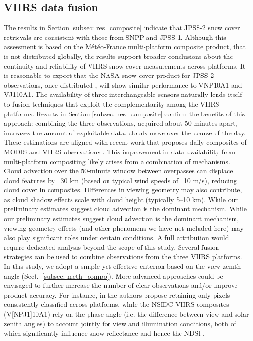 \documentclass[tc, manuscript]{copernicus}
\begin{document}
\subsection{VIIRS data fusion}
\label{subsec: disc_multiplatform}

The results in Section \ref{subsec: res_composite} indicate that JPSS-2 snow cover retrievals are consistent with those from SNPP and JPSS-1. Although this assessment is based on the Météo-France multi-platform composite product, that is not distributed globally, the results support broader conclusions about the continuity and reliability of VIIRS snow cover measurements across platforms. It is reasonable to expect that the NASA snow cover product for JPSS-2 observations, once distributed \citep{riggs2023viirs}, will show similar performance to VNP10A1 and VJ110A1. The availability of three interchangeable sensors naturally lends itself to fusion techniques that exploit the complementarity among the VIIRS platforms.  
Results in Section \ref{subsec: res_composite} confirm the benefits of this approach: combining the three observations, acquired about 50 minutes apart, increases the amount of exploitable data. clouds move over the course of the day. These estimations are aligned with recent work that proposes daily composites of MODIS and VIIRS observations  \citep{dietz_brief_2025}. This improvement in data availability from multi-platform compositing likely arises from a combination of mechanisms. Cloud advection over the \~50-minute window between overpasses can displace cloud features by ~30 km (based on typical wind speeds of ~10 m/s), reducing cloud cover in composites. Differences in viewing geometry may also contribute, as cloud shadow effects scale with cloud height (typically 5–10 km). While our preliminary estimates suggest cloud advection is the dominant mechanism. While our preliminary estimates suggest cloud advection is the dominant mechanism, viewing geometry effects (and other phenomena we have not included here) may also play significant roles under certain conditions. A full attribution would require dedicated analysis beyond the scope of this study. Several fusion strategies can be used to combine observations from the three VIIRS platforms. In this study, we adopt a simple yet effective criterion based on the view zenith angle (Sect.~\ref{subsec: meth_compo}). More advanced approaches could be envisaged to further increase the number of clear observations and/or improve product accuracy. For instance, in  the authors propose retaining only pixels consistently classified across platforms, while the NSIDC VIIRS composites (V[NP\textbar J1]10A1) rely on the phase angle (i.e. the difference between view and solar zenith angles) to account jointly for view and illumination conditions, both of which significantly influence snow reflectance and hence the NDSI \citep{ji2022NewIndexSnow}. 
\end{document}
